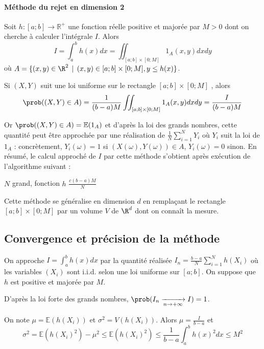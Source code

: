 \paragraph{Méthode du rejet en dimension 2}
Soit $h \colon [a;b] \to \mathbb{R}^+$ une fonction réelle  positive et majorée par $M>0$ dont on cherche à calculer l'intégrale $I$. Alors 
$$I=\int_a^b h(x)dx = \iint_{[a;b] \times [0;M]} 1_A(x,y)dxdy$$
où $A = \{(x,y)\in \R^2 \, \mid \, (x,y) \in [a;b]\times [0;M], y \leq h(x)\}$.

Si $(X,Y)$ suit une loi uniforme sur  le rectangle $[a;b]\times [0;M]$ , alors $$\prob((X,Y)\in A) = \frac{1}{(b-a)M} \iint_{[a;b] \times [0;M]} 1_A(x,y)dxdy =  \frac{I}{(b-a)M}$$

Or $\prob((X,Y)\in A) = \mathbb{E}(1_A)$ et d'après la loi des grands nombres, cette quantité peut être approchée par une réalisation de $\frac{1}{N}\sum_{i=1}^N Y_i$ où $Y_i$ suit la loi de $1_A$ : concrètement, $Y_i(\omega)= 1$ si $(X(\omega),Y(\omega)) \in A$, $Y_i(\omega)= 0$ sinon. En résumé, le calcul approché de $I$ par cette méthode s'obtient après exécution de l'algorithme suivant :

\begin{algorithmic}
	\REQUIRE $N$ grand, fonction $h$
	 \ENDIF
	\ENDFOR
	\ENSURE $\frac{c(b-a)M}{N}$
\end{algorithmic}

Cette méthode se généralise en dimension $d$ en remplaçant le rectangle $[a;b]\times [0;M]$ par un volume $V$ de $\R^d$ dont on connaît la mesure. 

\subsection{Convergence et précision de la méthode}

On approche $I=\int_a^b h(x)dx$ par la quantité réalisée $I_n = \frac{b-a}{N}\sum_{i=1}^N h(X_i)$ où les variables $(X_i)$ sont i.i.d. selon une loi uniforme sur $[a;b]$. On suppose que $h$ est positive et majorée par $M$. 

D'après la loi forte des grands nombres, $\prob(I_n   \xrightarrow[n \to +\infty]{} I ) = 1$. 

On note $\mu = \mathbb{E}(h(X_i))$ et $\sigma^2 = V(h(X_i))$. Alors $\mu = \frac{I}{b-a}$ et $$\sigma^2 = \mathbb{E}(h(X_i)^2)-\mu^2 \leq \mathbb{E}(h(X_i)^2) \leq \frac{1}{b-a}\int_a^b h(x)^2 dx \leq M^2$$


